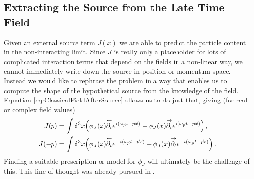 \subsection{Extracting the Source from the Late Time Field}

Given an external source term $J(x)$ we are able to predict the particle content in the non-interacting limit. Since $J$ is really only a placeholder for lots of complicated interaction terms that depend on the fields in a non-linear way, we cannot immediately write down the source in position or momentum space. Instead we would like to rephrase the problem in a way that enables us to compute the shape of the hypothetical source from the knowledge of the field. Equation \eqref{eq:ClassicalFieldAfterSource} allows us to do just that, giving (for real or complex field values)
\begin{subequations}
    \begin{align}        
        J(p)&=\int\text{d}^3x\Big(\phi_J(x)\overset{\leftarrow}{\partial_t}e^{{i}(\omega_{\vec{p}}t-\vec{p}\vec{x})}-\phi_J(x)\overset{\rightarrow}{\partial_t}e^{{i}(\omega_{\vec{p}}t-\vec{p}\vec{x})}\Big)\,,\\
        J(-p)&=\int\text{d}^3x\Big(\phi_J(x)\overset{\leftarrow}{\partial_t}e^{-{i}(\omega_{\vec{p}}t-\vec{p}\vec{x})}-\phi_J(x)\overset{\rightarrow}{\partial_t}e^{-{i}(\omega_{\vec{p}}t-\vec{p}\vec{x})}\Big)\,.
    \end{align}
    \label{eq:SourceFieldRelation}
\end{subequations} 
Finding a suitable prescription or model for $\phi_J$ will ultimately be the challenge of this. This line of thought was already pursued in \cite{Amelino-CameliaEtAl_1997}.